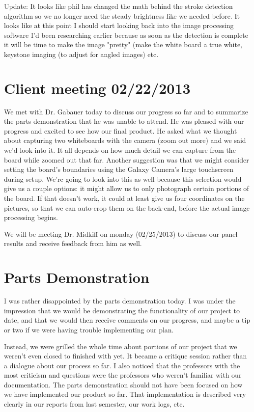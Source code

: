 \documentclass[]{article}
\begin{document}
	Update: It looks like phil has changed the math behind the stroke detection algorithm so we no longer need the steady brightness like we needed before. It looks like at this point I should start looking back into the image processing software I'd been researching earlier because as soon as the detection is complete it will be time to make the image "pretty" (make the white board a true white, keystone imaging (to adjust for angled images) etc.
	
	
	\section{Client meeting 02/22/2013}
	
	We met with Dr. Gabauer today to discuss our progress so far and to summarize the parts demonstration that he was unable to attend. He was pleased with our progress and excited to see how our final product. He asked what we thought about capturing two whiteboards with the camera (zoom out more) and we said we'd look into it. It all depends on how much detail we can capture from the board while zoomed out that far. Another suggestion was that we might consider setting the board's boundaries using the Galaxy Camera's large touchscreen during setup. We're going to look into this as well because this selection would give us a couple options: it might allow us to only photograph certain portions of the board. If that doesn't work, it could at least give us four coordinates on the pictures, so that we can auto-crop them on the back-end, before the actual image processing begins.
	
	We will be meeting Dr. Midkiff on monday (02/25/2013) to discuss our panel results and receive feedback from him as well.
	
	\section{Parts Demonstration}
	
	I was rather disappointed by the parts demonstration today. I was under the impression that we would be demonstrating the functionality of our project to date, and that we would then receive comments on our progress, and maybe a tip or two if we were having trouble implementing our plan.
	
	Instead, we were grilled the whole time about portions of our project that we weren't even closed to finished with yet. It became a critique session rather than a dialogue about our process so far. I also noticed that the professors with the most criticism and questions were the professors who weren't familiar with our documentation. The parts demonstration should not have been focused on how we have implemented our product so far. That implementation is described very clearly in our reports from last semester, our work logs, etc.	
	
\end{document}
